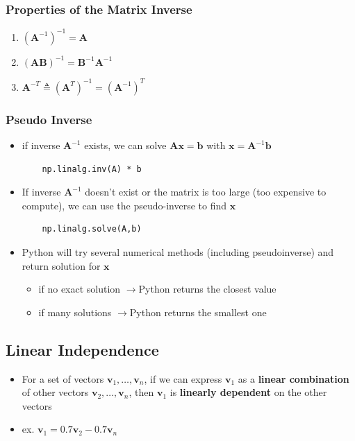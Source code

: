 \documentclass[letterpaper,12pt]{article}
\newcommand{\lra}{\ensuremath{\longrightarrow{}}}
\newcommand{\vect}[1]{\mathbf{#1}}
\newcommand{\matr}[1]{\mathbf{#1}}
\begin{document}
\subsubsection{Properties of the Matrix Inverse}
\begin{enumerate}
 \item $(\matr{A}^{-1})^{-1} = \matr{A}$
 \item $(\matr{A}\matr{B})^{-1} = \matr{B}^{-1}\matr{A}^{-1}$
 \item $\matr{A}^{-T} \triangleq (\matr{A}^T)^{-1} = (\matr{A}^{-1})^T$
\end{enumerate}

\subsubsection{Pseudo Inverse}
\begin{itemize}
 \item if inverse $\matr{A}^{-1}$ exists, we can solve $\matr{A}\vect{x} = \vect{b}$ with $\vect{x} = \matr{A}^{-1}\vect{b}$
       \begin{lstlisting}
    np.linalg.inv(A) * b
  \end{lstlisting}
 \item If inverse $\matr{A}^{-1}$ doesn't exist or the matrix is too large (too expensive to compute), we can use the pseudo-inverse to find $\vect{x}$
       \begin{lstlisting}
    np.linalg.solve(A,b)
  \end{lstlisting}
 \item Python will try several numerical methods (including pseudoinverse) and return solution for $\vect{x}$
       \begin{itemize}
        \item if no exact solution \lra Python returns the closest value
        \item if many solutions \lra Python returns the smallest one
       \end{itemize}
\end{itemize}


\subsection{Linear Independence}
\begin{itemize}
 \item For a set of vectors $\vect{v}_1, \dots, \vect{v}_n$, if we can express $\vect{v}_1$ as a \textbf{linear combination} of other vectors $\vect{v}_2, \dots, \vect{v}_n$, then $\vect{v}_1$ is \textbf{linearly dependent} on the other vectors
 \item ex. $\vect{v}_1 = 0.7\vect{v}_2 - 0.7 \vect{v}_n$
\end{itemize}
\end{document}
